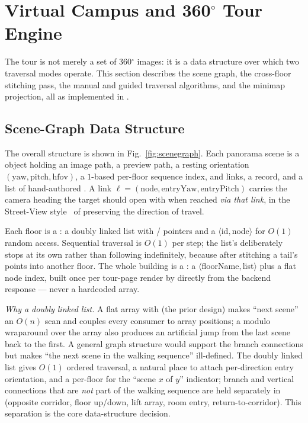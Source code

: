 \section{Virtual Campus and 360$^{\circ}$ Tour Engine}
\label{sec:tour}



The tour is not merely a set of 360$^{\circ}$ images: it is a data
structure over which two traversal modes operate. This section describes
the scene graph, the cross-floor stitching pass, the manual and guided
traversal algorithms, and the minimap projection, all as implemented in
.

\subsection{Scene-Graph Data Structure}
The overall structure is shown in Fig.~\ref{fig:scenegraph}. Each panorama
scene is a  object holding an image path,
a preview path, a resting orientation $(\mathrm{yaw}, \mathrm{pitch},
\mathrm{hfov})$, a $1$-based per-floor sequence index,  and
 links, a  record, and a list of
hand-authored . A link
$\ell = (\text{node}, \mathrm{entryYaw}, \mathrm{entryPitch})$ carries the
camera heading the target should open with when reached \emph{via that
link}, in the Street-View style~\cite{anguelov2010streetview} of preserving
the direction of travel.

Each floor is a : a doubly linked list with
/ pointers and a $\langle$id$,$node$\rangle$
for $O(1)$ random access. Sequential traversal is $O(1)$ per step; the
list's  deliberately stops at its own  rather
than following  indefinitely, because after stitching a tail's
 points into another floor. The whole building is a
: a $\langle$floorName$,$list$\rangle$ plus a
flat node index, built once per tour-page render by  directly
from the backend  response --- never a hardcoded array.

\emph{Why a doubly linked list.} A flat array with  (the
prior design) makes ``next scene'' an $O(n)$ scan and couples every
consumer to array positions; a modulo wraparound over the array also
produces an artificial jump from the last scene back to the first. A
general graph structure would support the branch connections but makes
``the next scene in the walking sequence'' ill-defined. The doubly linked
list gives $O(1)$ ordered traversal, a natural place to attach
per-direction entry orientation, and a per-floor  for the
``scene $x$ of $y$'' indicator; branch and vertical connections that are
\emph{not} part of the walking sequence are held separately in
 (opposite corridor, floor up/down, lift array, room
entry, return-to-corridor). This separation is the core data-structure
decision.

